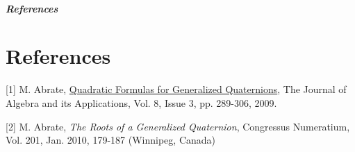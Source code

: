 \documentclass[letterpaper,10pt,english]{sphinxmanual}
\begin{document}
\paragraph{References}


\chapter{References}
\label{references:references}\label{references::doc}
{[}1{]} M. Abrate, \href{http://www.worldscinet.com/jaa/08/0803/S0219498809003308.html}{Quadratic Formulas for Generalized Quaternions}, The Journal of Algebra and its Applications, Vol. 8, Issue 3, pp. 289-306, 2009.

{[}2{]} M. Abrate, \emph{The Roots of a Generalized Quaternion}, Congressus Numeratium, Vol. 201, Jan. 2010, 179-187 (Winnipeg, Canada)



\renewcommand{\indexname}{Index}
\printindex
\end{document}
